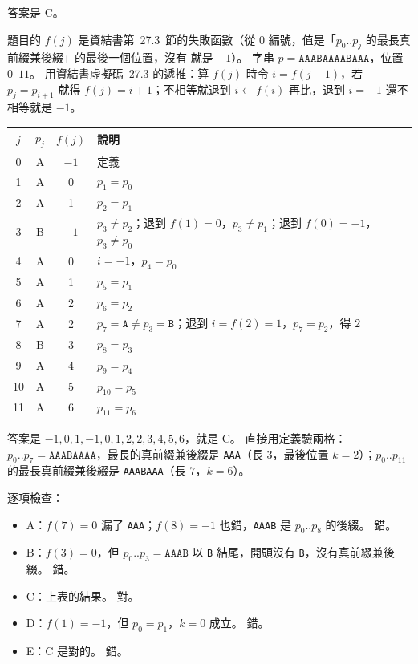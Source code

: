 \begin{pastsoln}
答案是 C。

題目的 $f(j)$ 是資結書第~27.3~節的失敗函數（從 $0$ 編號，值是「$p_0..p_j$ 的最長真前綴兼後綴」的最後一個位置，沒有
就是 $-1$）。 字串 $p = \texttt{AAABAAAABAAA}$，位置 $0$--$11$。 用資結書虛擬碼~27.3 的遞推：算 $f(j)$ 時令
$i = f(j - 1)$，若 $p_j = p_{i+1}$ 就得 $f(j) = i + 1$；不相等就退到 $i \gets f(i)$ 再比，退到 $i = -1$ 還不相等就是 $-1$。
\begin{center}
\small
\begin{tabular}{cccl}
\toprule
$j$ & $p_j$ & $f(j)$ & 說明 \\
\midrule
0 & A & $-1$ & 定義 \\
1 & A & 0 & $p_1 = p_0$ \\
2 & A & 1 & $p_2 = p_1$ \\
3 & B & $-1$ & $p_3 \ne p_2$；退到 $f(1) = 0$，$p_3 \ne p_1$；退到 $f(0) = -1$，$p_3 \ne p_0$ \\
4 & A & 0 & $i = -1$，$p_4 = p_0$ \\
5 & A & 1 & $p_5 = p_1$ \\
6 & A & 2 & $p_6 = p_2$ \\
7 & A & 2 & $p_7 = \texttt{A} \ne p_3 = \texttt{B}$；退到 $i = f(2) = 1$，$p_7 = p_2$，得 $2$ \\
8 & B & 3 & $p_8 = p_3$ \\
9 & A & 4 & $p_9 = p_4$ \\
10 & A & 5 & $p_{10} = p_5$ \\
11 & A & 6 & $p_{11} = p_6$ \\
\bottomrule
\end{tabular}
\end{center}
答案是 $-1, 0, 1, -1, 0, 1, 2, 2, 3, 4, 5, 6$，就是 C。 直接用定義驗兩格：$p_0..p_7 = \texttt{AAABAAAA}$，最長的真前綴兼後綴是
\texttt{AAA}（長 $3$，最後位置 $k = 2$）；$p_0..p_{11}$ 的最長真前綴兼後綴是 \texttt{AAABAAA}（長 $7$，$k = 6$）。

逐項檢查：
\begin{itemize}
\item A：$f(7) = 0$ 漏了 \texttt{AAA}；$f(8) = -1$ 也錯，\texttt{AAAB} 是 $p_0..p_8$ 的後綴。 錯。
\item B：$f(3) = 0$，但 $p_0..p_3 = \texttt{AAAB}$ 以 \texttt{B} 結尾，開頭沒有 \texttt{B}，沒有真前綴兼後綴。 錯。
\item C：上表的結果。 對。
\item D：$f(1) = -1$，但 $p_0 = p_1$，$k = 0$ 成立。 錯。
\item E：C 是對的。 錯。
\end{itemize}
\end{pastsoln}
